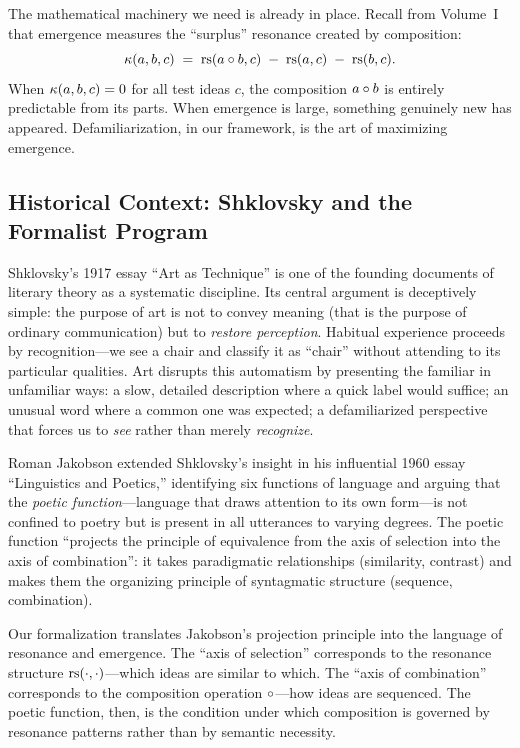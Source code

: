 The mathematical machinery we need is already in place.  Recall from Volume~I
that emergence measures the ``surplus'' resonance created by composition:
\[
  \kappa(a, b, c) \;=\; \mathrm{rs}(a \circ b, c) \;-\; \mathrm{rs}(a, c) \;-\; \mathrm{rs}(b, c).
\]
When $\kappa(a, b, c) = 0$ for all test ideas $c$, the composition $a \circ b$
is entirely predictable from its parts.  When emergence is large, something
genuinely new has appeared.  Defamiliarization, in our framework, is the art of
maximizing emergence.


\subsection{Historical Context: Shklovsky and the Formalist Program}

Shklovsky's 1917 essay ``Art as Technique'' is one of the founding documents of
literary theory as a systematic discipline.  Its central argument is deceptively
simple: the purpose of art is not to convey meaning (that is the purpose of
ordinary communication) but to \emph{restore perception}.  Habitual experience
proceeds by recognition---we see a chair and classify it as ``chair'' without
attending to its particular qualities.  Art disrupts this automatism by
presenting the familiar in unfamiliar ways: a slow, detailed description where a
quick label would suffice; an unusual word where a common one was expected; a
defamiliarized perspective that forces us to \emph{see} rather than merely
\emph{recognize}.

Roman Jakobson extended Shklovsky's insight in his influential 1960 essay
``Linguistics and Poetics,'' identifying six functions of language and arguing
that the \emph{poetic function}---language that draws attention to its own
form---is not confined to poetry but is present in all utterances to varying
degrees.  The poetic function ``projects the principle of equivalence from the
axis of selection into the axis of combination'': it takes paradigmatic
relationships (similarity, contrast) and makes them the organizing principle of
syntagmatic structure (sequence, combination).

Our formalization translates Jakobson's projection principle into the language
of resonance and emergence.  The ``axis of selection'' corresponds to the
resonance structure $\mathrm{rs}(\cdot, \cdot)$---which ideas are similar to which.
The ``axis of combination'' corresponds to the composition operation
$\circ$---how ideas are sequenced.  The poetic function, then, is the
condition under which composition is governed by resonance patterns rather than
by semantic necessity.


